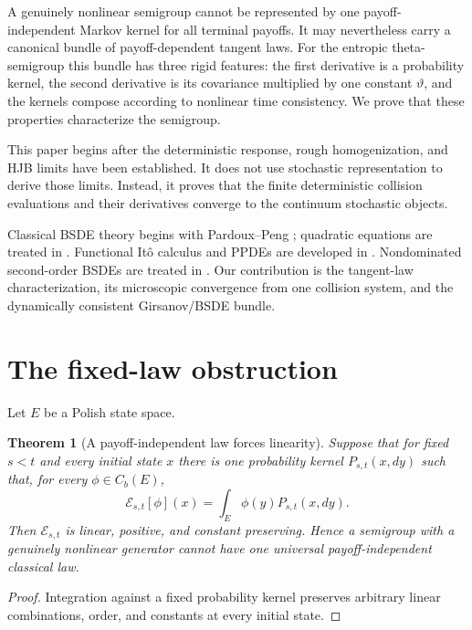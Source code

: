 \documentclass[11pt,reqno]{amsart}
\newtheorem{theorem}{Theorem}[section]
\theoremstyle{definition}
\theoremstyle{remark}
\newcommand{\cE}{\mathcal E}
\begin{document}
A genuinely nonlinear semigroup cannot be represented by one
payoff-independent Markov kernel for all terminal payoffs.  It may nevertheless
carry a canonical bundle of payoff-dependent tangent laws.  For the entropic
theta-semigroup this bundle has three rigid features: the first derivative is a
probability kernel, the second derivative is its covariance multiplied by one
constant $\vartheta$, and the kernels compose according to nonlinear time
consistency.  We prove that these properties characterize the semigroup.

This paper begins after the deterministic response, rough homogenization, and
HJB limits have been established.  It does not use stochastic representation
to derive those limits.  Instead, it proves that the finite deterministic
collision evaluations and their derivatives converge to the continuum
stochastic objects.

Classical BSDE theory begins with Pardoux--Peng \cite{PardouxPeng1990};
quadratic equations are treated in \cite{Kobylanski2000}.  Functional It\^o
calculus and PPDEs are developed in
\cite{Dupire2009,ContFournie2013,EkrenTouziZhang2014I,
EkrenTouziZhang2014II}.  Nondominated second-order BSDEs are treated in
\cite{CheriditoSonerTouziVictoir2007,SonerTouziZhang2012}.  Our contribution is
the tangent-law characterization, its microscopic convergence from one
collision system, and the dynamically consistent Girsanov/BSDE bundle.

\section{The fixed-law obstruction}

Let $E$ be a Polish state space.

\begin{theorem}[A payoff-independent law forces linearity]\label{thm:fixed-law}
Suppose that for fixed $s<t$ and every initial state $x$ there is one
probability kernel $P_{s,t}(x,dy)$ such that, for every
$\phi\in C_b(E)$,
\[
 \cE_{s,t}[\phi](x)=\int_E\phi(y)P_{s,t}(x,dy).
\]
Then $\cE_{s,t}$ is linear, positive, and constant preserving.  Hence a
semigroup with a genuinely nonlinear generator cannot have one universal
payoff-independent classical law.
\end{theorem}

\begin{proof}
Integration against a fixed probability kernel preserves arbitrary linear
combinations, order, and constants at every initial state.
\end{proof}
\end{document}
